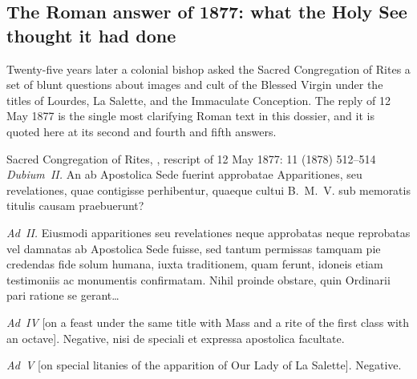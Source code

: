 \subsection{The Roman answer of 1877: what the Holy See thought it
had done}

Twenty-five years later a colonial bishop asked the Sacred
Congregation of Rites a set of blunt questions about images and cult
of the Blessed Virgin under the titles of Lourdes, La Salette, and
the Immaculate Conception. The reply of 12 May 1877 is the single
most clarifying Roman text in this dossier, and it is quoted here at
its second and fourth and fifth answers.

\begin{operativetext}{Sacred Congregation of Rites, , rescript of 12 May 1877:  11
(1878) 512--514}
\emph{Dubium~II.} An ab Apostolica Sede fuerint approbatae
Apparitiones, seu revelationes, quae contigisse perhibentur, quaeque
cultui B.~M.~V. sub memoratis titulis causam praebuerunt?\par
\emph{Ad~II.} Eiusmodi apparitiones seu revelationes neque approbatas
neque reprobatas vel damnatas ab Apostolica Sede fuisse, sed tantum
permissas tamquam pie credendas fide solum humana, iuxta traditionem,
quam ferunt, idoneis etiam testimoniis ac monumentis confirmatam.
Nihil proinde obstare, quin Ordinarii pari ratione se gerant\ldots\par
\emph{Ad~IV} [on a feast under the same title with Mass and a rite
of the first class with an octave]. Negative, nisi de speciali et
expressa apostolica facultate.\par
\emph{Ad~V} [on special litanies of the apparition of Our Lady of La
Salette]. Negative.
\end{operativetext}

